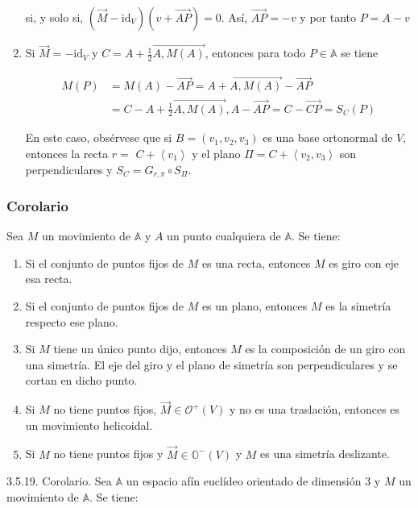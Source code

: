 \documentclass[12pt, a4paper, ones, notitlepage, openany,titlepage]{article}
\begin{document}
\begin{enumerate}[label=(\arabic*)]
si, y solo si, $\left(\overrightarrow{M}-\mathrm{id}_{V}\right)(v+\overrightarrow{A P})=0$. Así, $\overrightarrow{A P}=-v$ y por tanto $P=A-v$

\item Si $\overrightarrow{M}=-\mathrm{id}_{V}$ y $C=A+\frac{1}{2} \overrightarrow{A, M(A)}$, entonces para todo $P \in \mathbb{A}$ se tiene

$$
\begin{aligned}
	M(P) & =M(A)-\overrightarrow{A P}=A+\overrightarrow{A, M(A)}-\overrightarrow{A P} \\
	& =C-A+\frac{1}{2} \overrightarrow{A, M(A)}, A-\overrightarrow{A P}=C-\overrightarrow{C P}=S_{C}(P)
\end{aligned}
$$

En este caso, obsérvese que si $B=\left(v_{1}, v_{2}, v_{3}\right)$ es una base ortonormal de $V$, entonces la recta $r=$ $C+\left\langle v_{1}\right\rangle$ y el plano $\Pi=C+\left\langle v_{2}, v_{3}\right\rangle$ son perpendiculares y $S_{C}=G_{r, \pi} \circ S_{\Pi}$.
\end{enumerate}

\subsubsection{Corolario}
\noindent Sea $M$ un movimiento de $\mathbb{A}$ y $A$ un punto cualquiera de $\mathbb{A}$. Se tiene:
\begin{enumerate}[label=(\arabic*)]
\item Si el conjunto de puntos fijos de $M$ es una recta, entonces $M$ es giro con eje esa recta.
\item Si el conjunto de puntos fijos de $M$ es un plano, entonces $M$ es la simetría respecto ese plano.
\item Si $M$ tiene un único punto dijo, entonces $M$ es la composición de un giro con una simetría. El eje del giro y el plano de simetría son perpendiculares y se cortan en dicho punto.
\item Si $M$ no tiene puntos fijos, $\overrightarrow{M} \in \mathcal{O}^+(V)$ y no es una traslación, entonces es un movimiento helicoidal.
\item Si $M$ no tiene puntos fijos y $\overrightarrow{M} \in \mathbb{O}^-(V)$ y $M$ es una simetría deslizante.
\end{enumerate}

3.5.19. Corolario. Sea $\mathbb{A}$ un espacio afín euclídeo orientado de dimensión 3 y $M$ un movimiento de $\mathbb{A}$. Se tiene:
\end{document}
